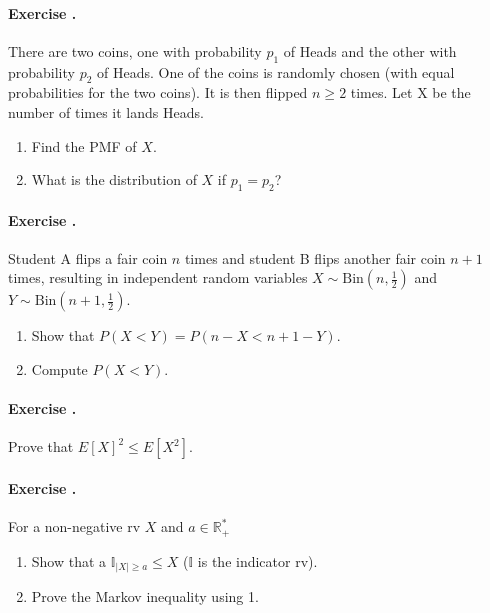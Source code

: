 \documentclass[twocolumn,12pt,a4paper]{article}
\newcommand{\R}{\mathbb R}
\newcounter{num}  %
\begin{document}
	\paragraph{Exercise \thenum.}
	There are two coins, one with probability $p_1$ of Heads and the other with probability $p_2$ of Heads. 
	One of the coins is randomly chosen (with equal probabilities for the two coins). 
	It is then flipped $n \geq 2$ times. 
	Let X be the number of times it lands Heads.
	\begin{enumerate}
		\item Find the PMF of $X$.
		\item What is the distribution of $X$ if $p_1 = p_2$?
		\end{enumerate}
	
	
	
	\paragraph{Exercise \thenum.}
	Student A flips a fair coin \(n\) times and student B flips another fair coin \(n+1\) times, resulting in independent random variables \( X \sim \text{Bin}(n, \frac{1}{2}) \) and \( Y \sim \text{Bin}(n+1, \frac{1}{2}) \).
	
	
	\begin{enumerate}
		\item Show that \( P(X < Y) = P(n - X < n + 1 - Y) \).
	
	\item Compute \( P(X < Y) \).
	\end{enumerate}
	
	
	
	\paragraph{Exercise \thenum.}
	Prove that $E[X]^2\leq E[X^2]$. %
	
	
	\paragraph{Exercise \thenum.}
	For a non-negative rv $X$ and $a\in\R_+^*$ 
	\begin{enumerate}
		\item Show that a $\mathbb I _{|X|\geq a} \leq X$ ($\mathbb I $ is the indicator rv).
		\item Prove the Markov inequality using 1.
	\end{enumerate}
	
\end{document}
